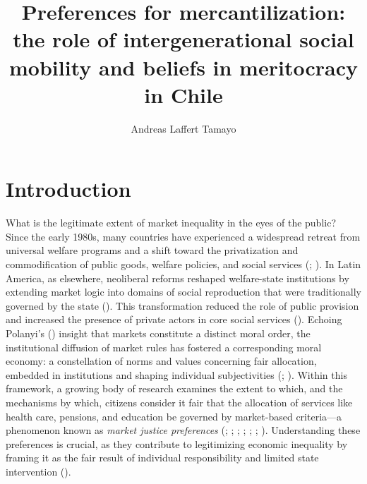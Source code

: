 \documentclass[
  13pt,
]{article}
\title{Preferences for mercantilization: the role of intergenerational
social mobility and beliefs in meritocracy in Chile}
\author{Andreas Laffert Tamayo}
\affil{%
                  Instituto de Sociología, Pontificia Universidad
                  Católica de Chile
              }
\date{}
\begin{document}
\maketitle

\section{Introduction}\label{introduction}

What is the legitimate extent of market inequality in the eyes of the
public? Since the early 1980s, many countries have experienced a
widespread retreat from universal welfare programs and a shift toward
the privatization and commodification of public goods, welfare policies,
and social services (; ). In Latin
America, as elsewhere, neoliberal reforms reshaped welfare-state
institutions by extending market logic into domains of social
reproduction that were traditionally governed by the state
(). This transformation
reduced the role of public provision and increased the presence of
private actors in core social services
(). Echoing Polanyi's
() insight that markets
constitute a distinct moral order, the institutional diffusion of market
rules has fostered a corresponding moral economy: a constellation of
norms and values concerning fair allocation, embedded in institutions
and shaping individual subjectivities
(;
). Within
this framework, a growing body of research examines the extent to which,
and the mechanisms by which, citizens consider it fair that the
allocation of services like health care, pensions, and education be
governed by market-based criteria---a phenomenon known as \emph{market
justice preferences} (; ; ; ;
;
;
).
Understanding these preferences is crucial, as they contribute to
legitimizing economic inequality by framing it as the fair result of
individual responsibility and limited state intervention
().
\end{document}
